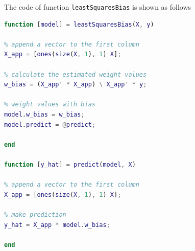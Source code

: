 \documentclass[10pt]{article}
\begin{document}
The code of function \texttt{leastSquaresBias} is shown as follows
\begin{lstlisting}[language=MATLAB]
function [model] = leastSquaresBias(X, y)

% append a vector to the first column
X_app = [ones(size(X, 1), 1) X];

% calculate the estimated weight values
w_bias = (X_app' * X_app) \ X_app' * y;

% weight values with bias
model.w_bias = w_bias;
model.predict = @predict;

end

function [y_hat] = predict(model, X)

% append a vector to the first column
X_app = [ones(size(X, 1), 1) X];

% make prediction
y_hat = X_app * model.w_bias;

end
\end{lstlisting}
\end{document}
